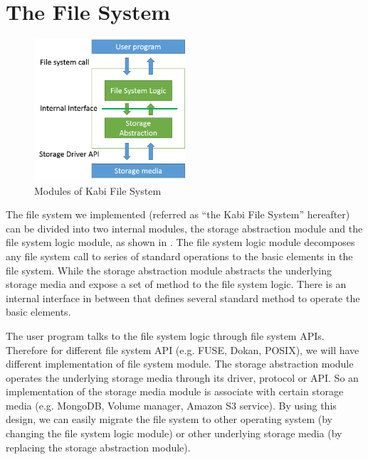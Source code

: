 \chapter{The File System}
\label{chap-three}
\begin{figure}[hbtp]
\centering
\includegraphics[width=0.5\textwidth]{Chapter-3/figs/fig8.png}
\caption{Modules of Kabi File System}
\label{fig:modules}
\end{figure}

    The file system we implemented (referred as “the Kabi File System” hereafter) can be divided into two internal modules, the storage abstraction module and the file system logic module, as shown in . The file system logic module decomposes any file system call to series of standard operations to the basic elements in the file system. While the storage abstraction module abstracts the underlying storage media and expose a set of method to the file system logic. There is an internal interface in between that defines several standard method to operate the basic elements. 

    The user program talks to the file system logic through file system APIs. Therefore for different file system API (e.g. FUSE, Dokan, POSIX), we will have different implementation of file system module. The storage abstraction module operates the underlying storage media through its driver, protocol or API. So an implementation of the storage media module is associate with certain storage media (e.g. MongoDB, Volume manager, Amazon S3 service). By using this design, we can easily migrate the file system to other operating system (by changing the file system logic module) or other underlying storage media (by replacing the storage abstraction module).

